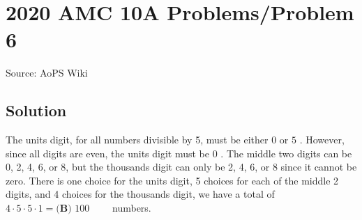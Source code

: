 \documentclass[12pt]{article}
\begin{document}
\section*{{2020 AMC 10A Problems/Problem 6}}
Source: AoPS Wiki

\subsection*{Solution}
The units digit, for all numbers divisible by 5, must be either $0$ or $5$ . However, since all digits are even, the units digit must be $0$ . The middle two digits can be 0, 2, 4, 6, or 8, but the thousands digit can only be 2, 4, 6, or 8 since it cannot be zero. There is one choice for the units digit, 5 choices for each of the middle 2 digits, and 4 choices for the thousands digit, we have a total of $4\cdot5\cdot5\cdot1 = \boxed{\textbf{(B) } 100} \qquad$ numbers.
\end{document}
